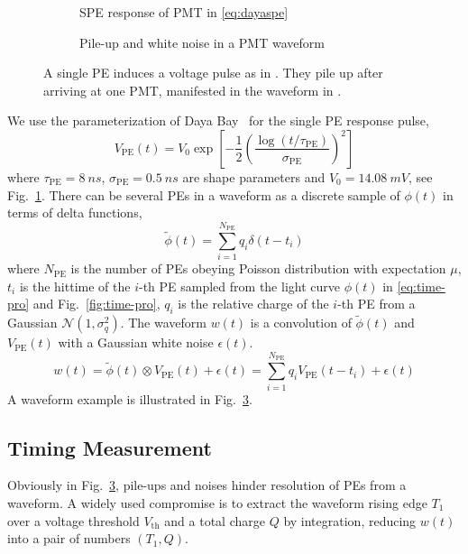 \begin{figure}[H]
  \begin{subfigure}{.49\textwidth}
    \centering
    \resizebox{\textwidth}{!}{}
    \caption{\label{fig:spe} SPE response of PMT in \eqref{eq:dayaspe}}
  \end{subfigure}
  \begin{subfigure}{.49\textwidth}
    \centering
    \resizebox{\textwidth}{!}{}
    \caption{\label{fig:pile} Pile-up and white noise in a PMT waveform}
  \end{subfigure}
  \caption{A single PE induces a voltage pulse as in .  They pile up after arriving at one PMT, manifested in the waveform in .}
\end{figure}

We use the parameterization of Daya Bay~\cite{jetter_pmt_2012} for the single PE response pulse,
\begin{equation}
  V_\mathrm{PE}(t) = V_{0}\exp\left[-\frac{1}{2}\left(\frac{\log(t/\tau_\mathrm{PE})}{\sigma_\mathrm{PE}}\right)^{2}\right]
  \label{eq:dayaspe}
\end{equation}
where $\tau_\mathrm{PE}=\SI{8}{ns}$, $\sigma_\mathrm{PE}=\SI{0.5}{ns}$ are shape parameters and $V_{0}=\SI{14.08}{mV}$, see Fig.~\ref{fig:spe}.  There can be several PEs in a waveform as a discrete sample of $\phi(t)$ in terms of delta functions,
\begin{equation}
  \label{eq:lc-sample}
  \tilde{\phi}(t) = \sum_{i=1}^{N_{\mathrm{PE}}} q_i \delta(t-t_i)
\end{equation}
where $N_\mathrm{PE}$ is the number of PEs obeying Poisson distribution with expectation $\mu$, $t_i$ is the hittime of the $i$-th PE sampled from the light curve $\phi(t)$ in \eqref{eq:time-pro} and Fig.~\ref{fig:time-pro}, $q_i$ is the relative charge of the $i$-th PE from a Gaussian $\mathcal{N}(1,\sigma_{q}^2)$.  The waveform $w(t)$ is a convolution of $\tilde{\phi}(t)$ and $V_\mathrm{PE}(t)$ with a Gaussian white noise $\epsilon(t)$.
\begin{equation}
  \label{eq:1}
  w(t) = \tilde{\phi}(t) \otimes V_\mathrm{PE}(t) + \epsilon(t) =  \sum_{i=1}^{N_\mathrm{PE}} q_i V_\mathrm{PE}(t-t_i) + \epsilon(t)
\end{equation}
A waveform example is illustrated in Fig.~\ref{fig:pile}.

\subsection{Timing Measurement}
Obviously in Fig.~\ref{fig:pile}, pile-ups and noises hinder resolution of PEs from a waveform.  A widely used compromise is to extract the waveform rising edge $T_1$ over a voltage threshold $V_\mathrm{th}$ and a total charge $Q$ by integration, reducing $w(t)$ into a pair of numbers $(T_1, Q)$.

